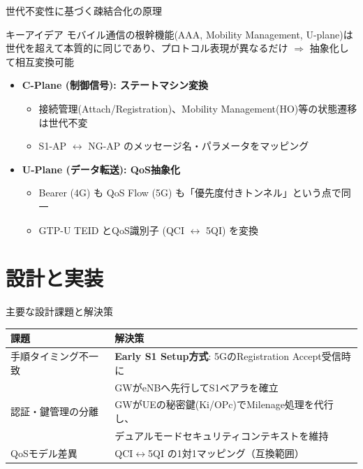 \documentclass[dvipdfmx,11pt,aspectratio=169]{beamer}
\begin{document}
\begin{frame}{世代不変性に基づく疎結合化の原理}
  \begin{block}{キーアイデア}
    モバイル通信の根幹機能(AAA, Mobility Management, U-plane)は世代を超えて\alert{本質的に同じ}であり、プロトコル表現が異なるだけ $\Rightarrow$ 抽象化して相互変換可能
  \end{block}
  \begin{itemize}
    \item \textbf{C-Plane (制御信号): ステートマシン変換}
      \begin{itemize}
        \item 接続管理(Attach/Registration)、Mobility Management(HO)等の状態遷移は世代不変
        \item S1-AP $\leftrightarrow$ NG-AP のメッセージ名・パラメータをマッピング
      \end{itemize}
    \item \textbf{U-Plane (データ転送): QoS抽象化}
      \begin{itemize}
        \item Bearer (4G) も QoS Flow (5G) も「優先度付きトンネル」という点で同一
        \item GTP-U TEID とQoS識別子 (QCI $\leftrightarrow$ 5QI) を変換
      \end{itemize}
  \end{itemize}
\end{frame}

\section{設計と実装}
\begin{frame}{主要な設計課題と解決策}
  \begin{table}
    \small
    \begin{tabular}{|l|p{8cm}|}
      \hline
      \textbf{課題} & \textbf{解決策} \\
      \hline
      手順タイミング不一致 & \textbf{Early S1 Setup方式}: 5GのRegistration Accept受信時に\\
      & GWがeNBへ先行してS1ベアラを確立 \\
      \hline
      認証・鍵管理の分離 & GWがUEの秘密鍵(Ki/OPc)でMilenage処理を代行し、\\
      & デュアルモードセキュリティコンテキストを維持 \\
      \hline
      QoSモデル差異 & QCI$\leftrightarrow$5QI の1対1マッピング（互換範囲）\\
      \hline
    \end{tabular}
  \end{table}
\end{frame}
\end{document}
